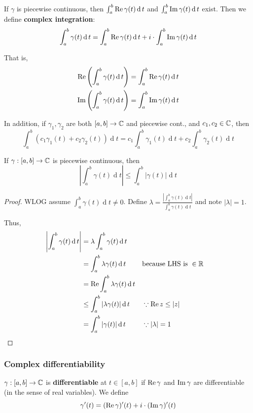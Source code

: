 \documentclass[12pt]{article}
\renewcommand{\d}{\ensuremath{\operatorname{d}}}
\begin{document}
If $\gamma$ is piecewise continuous, then $\int_{a}^{b}\re \gamma(t)\d t$ and $\int_{a}^{b}\im \gamma(t)\d t$ exist. Then we define \textbf{complex integration}:
\[\int_{a}^{b}\gamma(t)\d t = \int_{a}^{b}\re \gamma(t)\d t +i\cdot \int_{a}^{b}\im \gamma(t)\d t\]

That is, \begin{align*}
    \re \left(\int_{a}^{b}\gamma(t)\d t\right)&=\int_{a}^{b}\re \gamma(t)\d t\\
    \im \left(\int_{a}^{b}\gamma(t)\d t\right)&=\int_{a}^{b}\im \gamma(t)\d t\\
\end{align*}

In addition, if $\gamma_1,\gamma_2$ are both $[a,b]\to \mathbb{C}$ and piecewise cont., and $c_1,c_2\in\mathbb{C}$, then \[\int_{a}^{b}\left( c_1\gamma_1(t)+c_2\gamma_2(t) \right)\d t=c_1\int_{a}^{b}\gamma_1(t)\d t+c_2\int_{a}^{b}\gamma_2(t)\d t\]

\begin{proposition}
    If $\gamma:[a,b]\to \mathbb{C}$ is {piecewise} continuous, then \[\left|\int_{a}^{b}\gamma(t)\d t \right|\leq \int_{a}^{b}|\gamma(t)|\d t \]
\end{proposition}
\begin{proof}
    WLOG assume $ \int_{a}^{b}\gamma(t)\d t \neq 0$. Define $\lambda = \frac{\left|\int_{a}^{b}\gamma(t)\d t\right|}{\int_{a}^{b}\gamma(t)\d t}$ and note $|\lambda|=1$.

    Thus, \begin{align*}
        \left|\int_{a}^{b}\gamma(t)\d t\right| &= \lambda\int_{a}^{b}\gamma(t)\d t\\
        &= \int_{a}^{b}\lambda\gamma(t)\d t &&\text{because LHS is }\in \R\\
        &= \re \int_{a}^{b}\lambda\gamma(t)\d t\\
        &\leq \int_{a}^{b}|\lambda\gamma(t)|\d t &&\because \re z\leq |z|\\
        &= \int_{a}^{b}|\gamma(t)|\d t&& \because |\lambda|=1
    \end{align*}
\end{proof}

\subsubsection{Complex differentiability}
 $\gamma:[a,b]\to \mathbb{C}$ is \textbf{differentiable} at $t\in [a,b]$ if $\operatorname{Re} \gamma$ and $\operatorname{Im} \gamma$ are differentiable (in the sense of real variables). We define \[\gamma'(t)=(\operatorname{Re} \gamma)'(t)+i\cdot (\operatorname{Im} \gamma)'(t)\]
\end{document}
